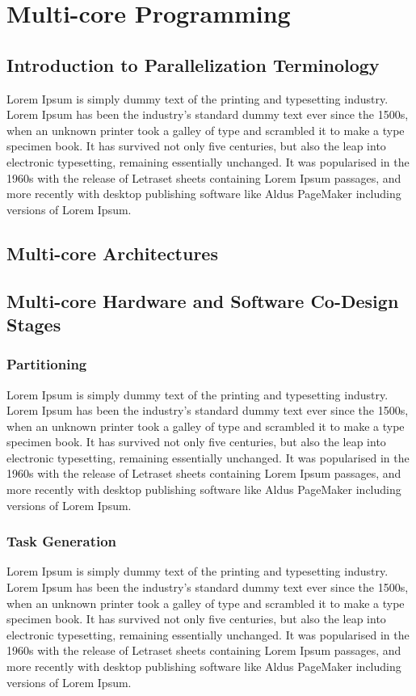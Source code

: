 \chapter{Multi-core Programming}  %
\section{Introduction to Parallelization Terminology}
Lorem Ipsum is simply dummy text of the printing and typesetting industry. Lorem Ipsum has been the industry's standard dummy text ever since the 1500s, when an unknown printer took a galley of type and scrambled it to make a type specimen book. It has survived not only five centuries, but also the leap into electronic typesetting, remaining essentially unchanged. It was popularised in the 1960s with the release of Letraset sheets containing Lorem Ipsum passages, and more recently with desktop publishing software like Aldus PageMaker including versions of Lorem Ipsum.

\section{Multi-core Architectures}

\section{Multi-core Hardware and Software Co-Design Stages}
\subsection{Partitioning}
Lorem Ipsum is simply dummy text of the printing and typesetting industry. Lorem Ipsum has been the industry's standard dummy text ever since the 1500s, when an unknown printer took a galley of type and scrambled it to make a type specimen book. It has survived not only five centuries, but also the leap into electronic typesetting, remaining essentially unchanged. It was popularised in the 1960s with the release of Letraset sheets containing Lorem Ipsum passages, and more recently with desktop publishing software like Aldus PageMaker including versions of Lorem Ipsum.

\subsection{Task Generation}
Lorem Ipsum is simply dummy text of the printing and typesetting industry. Lorem Ipsum has been the industry's standard dummy text ever since the 1500s, when an unknown printer took a galley of type and scrambled it to make a type specimen book. It has survived not only five centuries, but also the leap into electronic typesetting, remaining essentially unchanged. It was popularised in the 1960s with the release of Letraset sheets containing Lorem Ipsum passages, and more recently with desktop publishing software like Aldus PageMaker including versions of Lorem Ipsum.

